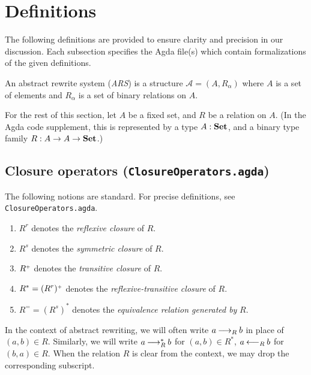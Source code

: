 \section{Definitions}
\label{sec:Definitions}
The following definitions are provided to ensure clarity and precision
in our discussion. Each subsection specifies the Agda file(s) which contain formalizations of the given definitions.

\begin{definition}
    An abstract rewrite system (\emph{ARS}) is a structure $\mathcal{A} = (A, R_\alpha)$ where
     $A$ is a set of elements and $R_\alpha$ is a set of binary relations on $A$.
\end{definition}

For the rest of this section, let $A$ be a fixed set, and $R$ be a relation on $A$.
(In the Agda code supplement, this is represented by a type $A : \mathbf{Set}$,
and a binary type family $R : A \to A \to \mathbf{Set}$.)


\subsection{Closure operators (\texttt{ClosureOperators.agda})}
\begin{notation}
  The following notions are standard.  For precise definitions,
  see \texttt{ClosureOperators.agda}.
  \begin{enumerate}
    \item $R^r$ denotes the \emph{reflexive closure} of $R$.
    \item $R^s$ denotes the \emph{symmetric closure} of $R$.
    \item ${R}^{\scriptscriptstyle{+}}$ denotes the \emph{transitive closure} of $R$.
    \item $R^* = (R^r){}^{\scriptscriptstyle{+}}$ denotes the \emph{reflexive-transitive closure} of $R$.
    \item $R^= = (R^s)^*$ denotes the \emph{equivalence relation generated by} $R$.
  \end{enumerate}
\end{notation}




In the context of abstract rewriting, we will often write $a \mathbin{\longrightarrow_R} b$
in place of $(a,b) \in R$.  Similarly, we will write $a \mathbin{\longrightarrow_R^*} b$ for $(a,b) \in R^*$,
$a \mathbin{\longleftarrow_R} b$ for $(b,a) \in R$.  When the relation $R$ is clear from the context,
we may drop the corresponding subscript.


